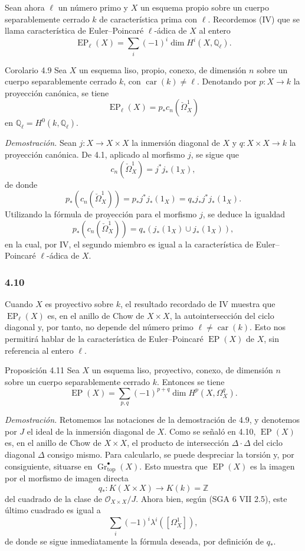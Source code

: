 Sean ahora $\ell$ un número primo y $X$ un esquema propio sobre un cuerpo separablemente cerrado $k$ de característica prima con $\ell$. Recordemos (IV) que se llama característica de Euler--Poincaré $\ell$-ádica de $X$ al entero
\[
\operatorname{EP}_\ell(X)=\sum_i(-1)^i\dim H^i(X,\mathbb Q_\ell).
\]

\begin{statement}{Corolario 4.9}
Sea $X$ un esquema liso, propio, conexo, de dimensión $n$ sobre un cuerpo separablemente cerrado $k$, con $\operatorname{car}(k)\ne\ell$. Denotando por $p:X\to k$ la proyección canónica, se tiene
\[
\operatorname{EP}_\ell(X)=p_*c_n(\check\Omega^1_X)
\]
en $\mathbb Q_\ell=H^0(k,\mathbb Q_\ell)$.
\end{statement}

\emph{Demostración.} Sean $j:X\to X\times X$ la inmersión diagonal de $X$ y $q:X\times X\to k$ la proyección canónica. De 4.1, aplicado al morfismo $j$, se sigue que
\[
c_n(\check\Omega^1_X)=j^*j_*(1_X),
\]
de donde
\[
p_*(c_n(\check\Omega^1_X))=p_*j^*j_*(1_X)=q_*j_*j^*j_*(1_X).
\]
Utilizando la fórmula de proyección para el morfismo $j$, se deduce la igualdad
\[
p_*(c_n(\check\Omega^1_X))=q_*(j_*(1_X)\cup j_*(1_X)),
\]
en la cual, por IV, el segundo miembro es igual a la característica de Euler--Poincaré $\ell$-ádica de $X$.

\subsubsection*{4.10}
Cuando $X$ es proyectivo sobre $k$, el resultado recordado de IV muestra que $\operatorname{EP}_\ell(X)$ es, en el anillo de Chow de $X\times X$, la autointersección del ciclo diagonal y, por tanto, no depende del número primo $\ell\ne\operatorname{car}(k)$. Esto nos permitirá hablar de la característica de Euler--Poincaré $\operatorname{EP}(X)$ de $X$, sin referencia al entero $\ell$.

\begin{statement}{Proposición 4.11}
Sea $X$ un esquema liso, proyectivo, conexo, de dimensión $n$ sobre un cuerpo separablemente cerrado $k$. Entonces se tiene
\[
\operatorname{EP}(X)=\sum_{p,q}(-1)^{p+q}\dim H^p(X,\Omega_X^q).
\]
\end{statement}

\emph{Demostración.} Retomemos las notaciones de la demostración de 4.9, y denotemos por $J$ el ideal de la inmersión diagonal de $X$. Como se señaló en 4.10, $\operatorname{EP}(X)$ es, en el anillo de Chow de $X\times X$, el producto de intersección $\Delta\cdot\Delta$ del ciclo diagonal $\Delta$ consigo mismo. Para calcularlo, se puede despreciar la torsión y, por consiguiente, situarse en $\operatorname{Gr}_{\mathrm{top}}^\bullet(X)$. Esto muestra que $\operatorname{EP}(X)$ es la imagen por el morfismo de imagen directa
\[
q_*:K(X\times X)\to K(k)=\mathbb Z
\]
del cuadrado de la clase de $\mathcal O_{X\times X}/J$. Ahora bien, según (SGA 6 VII 2.5), este último cuadrado es igual a
\[
\sum_i(-1)^i\lambda^i([\Omega_X^1]),
\]
de donde se sigue inmediatamente la fórmula deseada, por definición de $q_*$.
